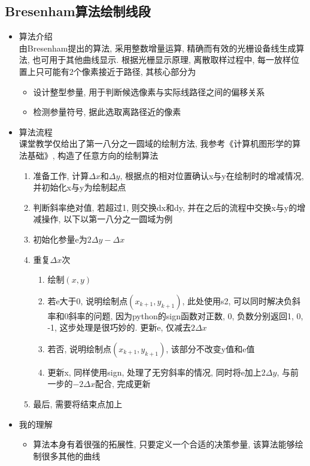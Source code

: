 \documentclass[a4paper,UTF8]{article}
\theoremstyle{definition}
\begin{document}
\subsection{Bresenham算法绘制线段}
\begin{itemize}
  \item 算法介绍\\
  由Bresenham提出的算法, 采用整数增量运算, 精确而有效的光栅设备线生成算法, 也可用于其他曲线显示. 根据光栅显示原理, 离散取样过程中, 每一放样位置上只可能有2个像素接近于路径, 其核心部分为\begin{itemize}
    \item 设计整型参量, 用于判断候选像素与实际线路径之间的偏移关系
    \item 检测参量符号, 据此选取离路径近的像素
  \end{itemize}
  \item 算法流程\\
  课堂教学仅给出了第一八分之一圆域的绘制方法, 我参考《计算机图形学的算法基础》, 构造了任意方向的绘制算法
  \begin{enumerate}
    \item 准备工作, 计算$\Delta x$和$\Delta y$, 根据点的相对位置确认x与y在绘制时的增减情况, 并初始化x与y为绘制起点
    \item 判断斜率绝对值, 若超过1, 则交换dx和dy, 并在之后的流程中交换x与y的增减操作, 以下以第一八分之一圆域为例
    \item 初始化参量e为$2\Delta y-\Delta x$
    \item 重复$\Delta x$次\begin{enumerate}
      \item 绘制$(x,y)$
      \item 若e大于0, 说明绘制点$(x_{k+1}, y_{k+1})$, 此处使用s2, 可以同时解决负斜率和0斜率的问题, 因为python的sign函数对正数, 0, 负数分别返回1, 0, -1, 这步处理是很巧妙的. 更新e, 仅减去$2\Delta x$
      \item 若否, 说明绘制点$(x_{k+1}, y_{k+1})$, 该部分不改变y值和e值
      \item 更新x, 同样使用sign, 处理了无穷斜率的情况, 同时将e加上$2\Delta y$, 与前一步的$-2\Delta x$配合, 完成更新
    \end{enumerate}
    \item 最后, 需要将结束点加上
  \end{enumerate}
  \item 我的理解\begin{itemize}
    \item 算法本身有着很强的拓展性, 只要定义一个合适的决策参量, 该算法能够绘制很多其他的曲线

\end{itemize}
\end{itemize}
\end{document}

